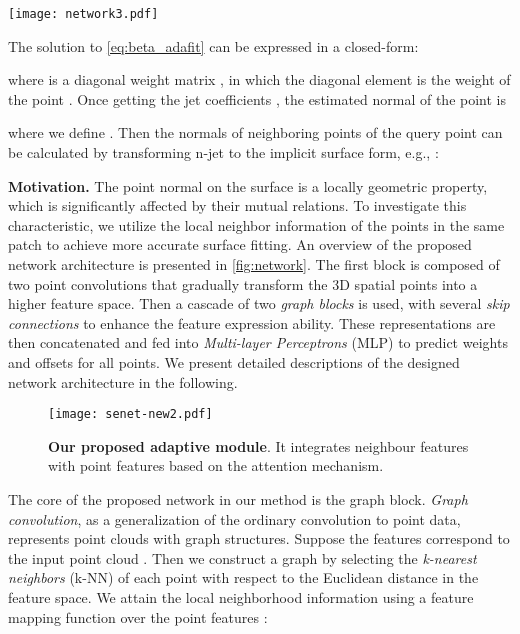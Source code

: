 \documentclass[runningheads]{llncs}
\begin{document}
\begin{figure*}[t]
  \centering
   \texttt{[image: network3.pdf]}
   \caption{\textbf{Overview of our proposed network architecture}. Graph block is utilized to encode the relationship between neighbor points, which contains an adaptive model to effectively integrate point features with the local neighbor features. A multi-scale layer is employed to extract richer local features. Given an input patch, our network predicts a point-wise weight and offset to fit a surface for normal estimation.}
   \label{fig:network}
\end{figure*}

The solution to \cref{eq:beta_adafit} can be expressed in a closed-form:

where  is a diagonal weight matrix , in which the diagonal element  is the weight of the point . Once getting the jet coefficients , the estimated normal  of the point  is

where we define . Then the normals of neighboring points of the query point can be calculated by transforming n-jet to the implicit surface form, e.g., : 




\noindent\textbf{{Motivation.}}\label{sec:leran-graph}
The point normal on the surface is a locally geometric property, which is significantly affected by their mutual relations. To investigate this characteristic, we utilize the local neighbor information of the points in the same patch to achieve more accurate surface fitting. An overview of the proposed network architecture is presented in \cref{fig:network}. The first block is composed of two point convolutions that gradually transform the 3D spatial points into a higher feature space. Then a cascade
of two \emph{graph blocks} is used, with several \emph{skip connections} to enhance the feature expression ability. These representations are then concatenated and fed into \textit{Multi-layer Perceptrons} (MLP) to predict weights and offsets for all points. We present detailed descriptions of the designed network architecture in the following.


 \begin{figure}[t]
  \centering
   \texttt{[image: senet-new2.pdf]}
   \caption{\textbf{Our proposed adaptive module}. It integrates neighbour features with point features based on the attention mechanism.}
   \label{fig:attention}
\end{figure}
 The core of the proposed network in our method is the graph block. \emph{Graph convolution}, as a generalization of the ordinary convolution to point data,  represents point clouds with graph structures. Suppose the features  correspond to the input point cloud  . Then we construct a graph by selecting the \textit{k-nearest neighbors} (k-NN) of each point with respect to the Euclidean distance in the feature space. We attain the local neighborhood information using a feature mapping function  over the point features :
\end{document}
